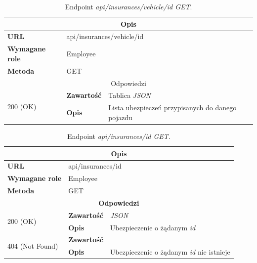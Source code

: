 \documentclass[eng,printmode,openany]{mgr}
\begin{document}
\begin{table}[H]
	\caption{Endpoint \textit{api/insurances/vehicle/id GET}.}
	\begin{tabularx}{\textwidth}{|l|l|X|}
		\hline
		\multicolumn{3}{|c|}{\textbf{\textbf{Opis}}}
		\\ \hline
		\textbf{URL}                         & \multicolumn{2}{l|}{api/insurances/vehicle/id}
		\\ \hline
		\textbf{Wymagane role}               & \multicolumn{2}{l|}{Employee}
		\\ \hline
		\textbf{Metoda}                      & \multicolumn{2}{l|}{GET}
		\\ \hline
		\multicolumn{3}{|c|}{ Odpowiedzi}
		\\ \hline
		\multirow{2}{*}{200 (OK)}   & \textbf{Zawartość}         & Tablica \textit{JSON}
		\\ \cline{2-3}              & \textbf{Opis}         	    & Lista ubezpieczeń przypisanych do danego pojazdu
		\\ \hline
	\end{tabularx}
\end{table}

\begin{table}[H]
	\caption{Endpoint \textit{api/insurances/id GET}.}
	\begin{tabularx}{\textwidth}{|l|l|X|}
		\hline
		\multicolumn{3}{|c|}{\textbf{\textbf{Opis}}}
		\\ \hline
		\textbf{URL}                         & \multicolumn{2}{l|}{api/insurances/id}
		\\ \hline
		\textbf{Wymagane role}               & \multicolumn{2}{l|}{Employee}
		\\ \hline
		\textbf{Metoda}                      & \multicolumn{2}{l|}{GET}
		\\ \hline
		\multicolumn{3}{|c|}{\textbf{Odpowiedzi}}
		\\ \hline
		\multirow{2}{*}{200 (OK)} 	        & \textbf{Zawartość}   	& \textit{JSON}
		\\ \cline{2-3}                      & \textbf{Opis}         	& Ubezpieczenie o żądanym \textit{id}
		\\ \hline
		\multirow{2}{*}{404 (Not Found)} 	& \textbf{Zawartość}     & 
		\\ \cline{2-3}                      & \textbf{Opis}          & Ubezpieczenie o żądanym \textit{id} nie istnieje
		\\ \hline
	\end{tabularx}
\end{table}
\end{document}
